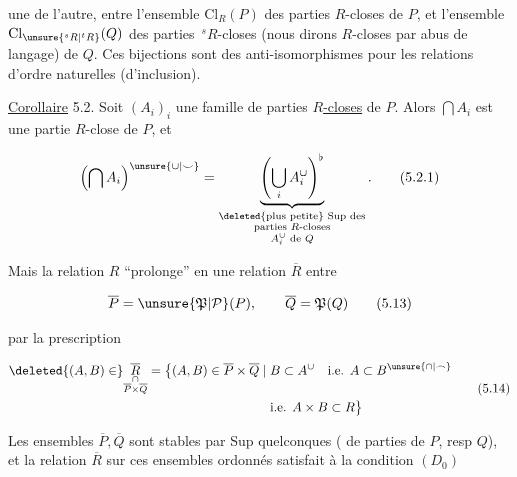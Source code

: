 
une de l'autre, entre l'ensemble $\mathrm{Cl}_R(P)$ des parties $R$-closes de $P$, et l'ensemble $\mathrm{Cl}_{\unsure{{}^{s}R|{}^{t}R}}(Q)$ des parties $\,{}^{s}R$-closes (nous dirons $R$-closes par abus de langage) de $Q$. Ces bijections sont  des anti-isomorphismes pour les relations d'ordre naturelles (d'inclusion).

\margin{\rule{0.4pt}{4\baselineskip}}%
\uline{Corollaire} 5.2. Soit $(A_i)_i$ une famille de parties \uline{$R$-closes} de $P$. Alors $\bigcap A_i$ est une partie $R$-close de $P$, et

\[
 \left(\bigcap A_i\right)^{\unsure{\cup|\smile}}=
 \underbrace{\left(\bigcup_i A_i^\cup\right)^\flat}_{
 \substack{\text{\deleted{plus petite} Sup des}\\\text{parties }R\text{-closes}\\A_i^\cup\text{ de }Q}}.
 \tag*{(5.2.1)}
\]

Mais la relation $R$  ``prolonge'' en une relation $\overline R$ entre

\[
 \overline P=\unsure{\mathfrak P|\mathcal P}(P),\qquad\overline Q=\mathfrak P(Q)
 \tag*{(5.13)}
\]

par la prescription

\[
\begin{aligned}
 \deleted{(A,B)\in}\underset{\substack{\cap\\\overline P\times\overline Q}}{\overline R}
  =\big\{(A,B)\in\overline P\times\overline Q\mid{}&
  B\subset A^\cup\quad\text{i.e. }A\subset B^{\unsure{\cap|\frown}}\\
 &\text{i.e. }A\times B\subset R\big\}
\end{aligned}
\tag*{(5.14)}
\]

 Les ensembles $\overline P,\overline Q$ sont stables par Sup quelconques ( de parties de $P$, resp $Q$), et la relation $\overline R$ sur ces ensembles ordonnés satisfait à la condition $(D_0)$

